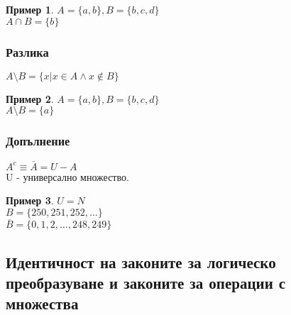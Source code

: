 \documentclass[fleqn, 12pt]{article}
\newtheorem{example}{Пример}[subsection]
\begin{document}
\begin{example}
$A = \{a, b\}, B = \{b, c, d\}$\\
$A \cap B = \{b\}$
\end{example}

\subsubsection{Разлика}

$A \setminus B = \{x | x \in A \land x \notin B \}$
\begin{example}
$A = \{a, b\}, B = \{b, c, d\}$\\
$A \setminus B = \{a\}$
\end{example}

\subsubsection{Допълнение}
$A^c \equiv  \overline{A} = U - A$\\ 
U - универсално множество. 

\begin{example}
$U = N$\\
$B = \{250, 251, 252, ...\}$\\
$\overline{B} = \{0, 1, 2, ..., 248, 249\}$
\end{example}

\subsection{Идентичност на законите за логическо преобразуване и законите за операции с множества}
\end{document}
